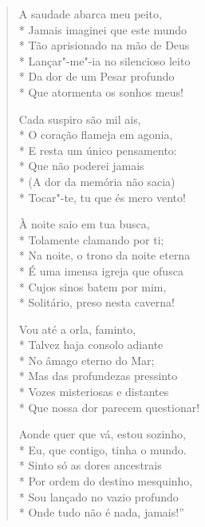 \begin{verse}
A saudade abarca meu peito,\\*
Jamais imaginei que este mundo\\*
Tão aprisionado na mão de Deus\\*
Lançar"-me"-ia no silencioso leito\\*
Da dor de um Pesar profundo\\*
Que atormenta os sonhos meus!

Cada suspiro são mil ais,\\*
O coração flameja em agonia,\\*
E resta um único pensamento:\\*
Que não poderei jamais\\*
(A dor da memória não sacia)\\*
Tocar"-te, tu que és mero vento!

À noite saio em tua busca,\\*
Tolamente clamando por ti;\\*
Na noite, o trono da noite eterna\\*
É uma imensa igreja que ofusca\\*
Cujos sinos batem por mim,\\*
Solitário, preso nesta caverna!

Vou até a orla, faminto,\\*
Talvez haja consolo adiante\\*
No âmago eterno do Mar;\\*
Mas das profundezas pressinto\\*
Vozes misteriosas e distantes\\*
Que nossa dor parecem questionar!

Aonde quer que vá, estou sozinho,\\*
Eu, que contigo, tinha o mundo.\\*
Sinto só as dores ancestrais\\*
Por ordem do destino mesquinho,\\*
Sou lançado no vazio profundo\\*
Onde tudo não é nada, jamais!”
\end{verse}

